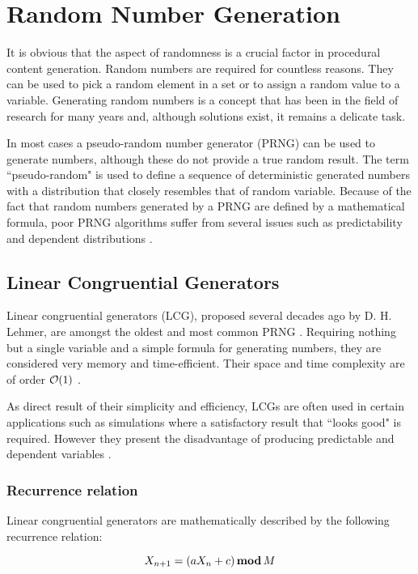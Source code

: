 \chapter{Random Number Generation}
It is obvious that the aspect of randomness is a crucial factor in procedural content generation. Random numbers are required for countless reasons. They can be used to pick a random element in a set or to assign a random value to a variable. Generating random numbers is a concept that has been in the field of research for many years and, although solutions exist, it remains a delicate task. 

In most cases a pseudo-random number generator (PRNG) can be used to generate numbers, although these do not provide a true random result. The term ``pseudo-random" is used to define a sequence of deterministic generated numbers with a distribution that closely resembles that of random variable. Because of the fact that random numbers generated by a PRNG are defined by a mathematical formula, poor PRNG algorithms suffer from several issues such as predictability and dependent distributions \citep{frieze_lcg}.

\section{Linear Congruential Generators}
Linear congruential generators (LCG), proposed several decades ago by D. H. Lehmer, are amongst the oldest and most common PRNG \citep{park_miller}. Requiring nothing but a single variable and a simple formula for generating numbers, they are considered very memory and time-efficient. Their space and time complexity are of order $\mathcal{O} (1)$ \citep{Knuth_art2}.

As direct result of their simplicity and efficiency, LCGs are often used in certain applications such as simulations where a satisfactory result that ``looks good" is required. However they present the disadvantage of producing predictable and dependent variables \citep{frieze_lcg}.

\subsection{Recurrence relation}
Linear congruential generators are mathematically described by the following recurrence relation:

\[ X_{n+1} = (a X_{n} + c) \, \textbf{mod} \, M \]

